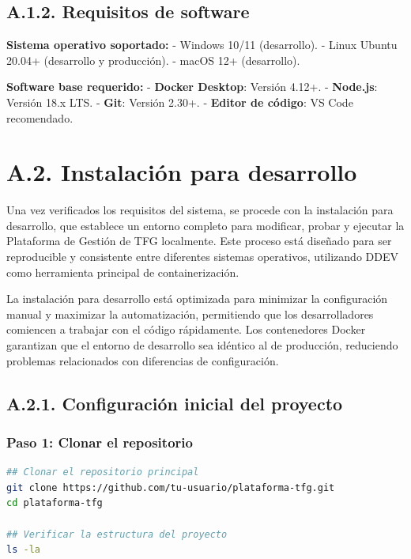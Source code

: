 \documentclass[12pt,a4paper,oneside]{report}
\begin{document}
\subsection{A.1.2. Requisitos de
software}\label{a.1.2.-requisitos-de-software}

\textbf{Sistema operativo soportado:} - Windows 10/11 (desarrollo). -
Linux Ubuntu 20.04+ (desarrollo y producción). - macOS 12+ (desarrollo).

\textbf{Software base requerido:} - \textbf{Docker Desktop}: Versión
4.12+. - \textbf{Node.js}: Versión 18.x LTS. - \textbf{Git}: Versión
2.30+. - \textbf{Editor de código}: VS Code recomendado.

\section{A.2. Instalación para
desarrollo}\label{a.2.-instalaciuxf3n-para-desarrollo}

Una vez verificados los requisitos del sistema, se procede con la instalación para desarrollo, que establece un entorno completo para modificar, probar y ejecutar la Plataforma de Gestión de TFG localmente. Este proceso está diseñado para ser reproducible y consistente entre diferentes sistemas operativos, utilizando DDEV como herramienta principal de containerización.

La instalación para desarrollo está optimizada para minimizar la configuración manual y maximizar la automatización, permitiendo que los desarrolladores comiencen a trabajar con el código rápidamente. Los contenedores Docker garantizan que el entorno de desarrollo sea idéntico al de producción, reduciendo problemas relacionados con diferencias de configuración.

\subsection{A.2.1. Configuración inicial del
proyecto}\label{a.2.1.-configuraciuxf3n-inicial-del-proyecto}

\subsubsection{Paso 1: Clonar el
repositorio}\label{paso-1-clonar-el-repositorio}

\begin{lstlisting}[language=bash]
## Clonar el repositorio principal
git clone https://github.com/tu-usuario/plataforma-tfg.git
cd plataforma-tfg

## Verificar la estructura del proyecto
ls -la
\end{lstlisting}
\end{document}
